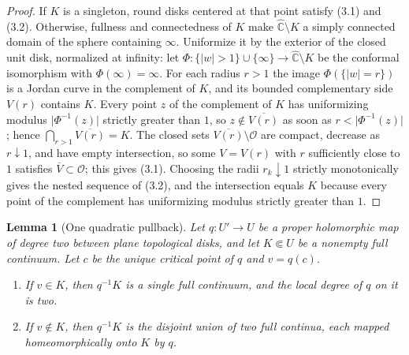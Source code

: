 \documentclass[11pt,reqno]{amsart}
\newtheorem{lemma}[theorem]{Lemma}
\theoremstyle{definition}
\theoremstyle{remark}
\begin{document}
\begin{proof}
If \(K\) is a singleton, round disks centered at that point satisfy (3.1) and (3.2).  Otherwise, fullness and connectedness of \(K\) make \(\widehat{\mathbb C}\setminus K\) a simply connected domain of the sphere containing \(\infty\).  Uniformize it by the exterior of the closed unit disk, normalized at infinity: let \(\Phi\colon\{\lvert w\rvert>1\}\cup\{\infty\}\to\widehat{\mathbb C}\setminus K\) be the conformal isomorphism with \(\Phi(\infty)=\infty\).  For each radius \(r>1\) the image \(\Phi(\{\lvert w\rvert=r\})\) is a Jordan curve in the complement of \(K\), and its bounded complementary side \(V(r)\) contains \(K\).  Every point \(z\) of the complement of \(K\) has uniformizing modulus \(\lvert\Phi^{-1}(z)\rvert\) strictly greater than \(1\), so \(z\notin\overline{V(r)}\) as soon as \(r<\lvert\Phi^{-1}(z)\rvert\); hence \(\bigcap_{r>1}\overline{V(r)}=K\).  The closed sets \(\overline{V(r)}\setminus\mathcal O\) are compact, decrease as \(r\downarrow1\), and have empty intersection, so some \(V=V(r)\) with \(r\) sufficiently close to \(1\) satisfies \(\overline V\subset\mathcal O\); this gives (3.1).  Choosing the radii \(r_k\downarrow1\) strictly monotonically gives the nested sequence of (3.2), and the intersection equals \(K\) because every point of the complement has uniformizing modulus strictly greater than \(1\).
\end{proof}
\begin{lemma}[One quadratic pullback]\label{lem:quadratic-pullback}
Let \(q\colon U'\to U\) be a proper holomorphic map of degree two between plane topological disks, and let \(K\Subset U\) be a nonempty full continuum.  Let \(c\) be the unique critical point of \(q\) and \(v=q(c)\).
\begin{enumerate}
\item If \(v\in K\), then \(q^{-1}K\) is a single full continuum, and the local degree of \(q\) on it is two.
\item If \(v\notin K\), then \(q^{-1}K\) is the disjoint union of two full continua, each mapped homeomorphically onto \(K\) by \(q\).
\end{enumerate}
\end{lemma}
\end{document}
